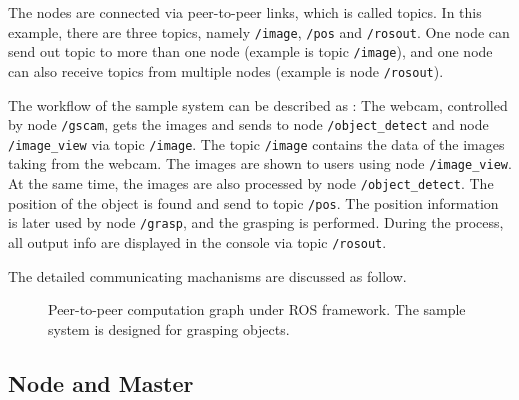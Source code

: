 \documentclass[a4paper, 10pt, conference]{ieeeconf}       %
\begin{document}
The nodes are connected via peer-to-peer links, which is called topics. In this example, there are three topics, namely \texttt{/image}, \texttt{/pos} and \texttt{/rosout}. One node can send out topic to more than one node (example is topic \texttt{/image}), and one node can also receive topics from multiple nodes (example is node \texttt{/rosout}). 

The workflow of the sample system can be described as : The webcam, controlled by node \texttt{/gscam}, gets the images and sends to node \texttt{/object\_detect} and node \texttt{/image\_view} via topic \texttt{/image}. The topic \texttt{/image} contains the data of the images taking from the webcam. The images are shown to users using node \texttt{/image\_view}. At the same time, the images are also processed by node \texttt{/object\_detect}. The position of the object is found and send to topic \texttt{/pos}. The position information is later used by node \texttt{/grasp}, and the grasping is performed. During the process, all output info are displayed in the console via topic \texttt{/rosout}.

The detailed communicating machanisms are discussed as follow.

\begin{figure}[htpb]
  \centering
  \caption{Peer-to-peer computation graph under ROS framework. The sample system is designed for grasping objects.}
  \label{fig:framework}
\end{figure}



\subsection{Node and Master}
\end{document}
